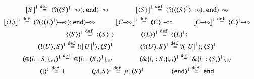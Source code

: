 \begin{figure}[t!]
\\
$
\begin{array}{c}
	\vtmap{{S}}{1} \defeq	\lhot{(\btinp{\lhot{\tmap{S}{1}}} \tinact)}
	\qquad \qquad
	\vtmap{\chtype{S}}{1} \defeq	\lhot{(\btinp{\shot{\chtype{\tmap{S}{1}}}} \tinact)}
	\\[1mm]

	\vtmap{\chtype{L}}{1} \defeq	\lhot{(\btinp{\shot{\chtype{\tmap{L}{1}}}} \tinact)}
		\qquad \quad
	\vtmap{\lhot{C}}{1} \defeq \lhot{\tmap{C}{1}}
	\qquad \quad
	\vtmap{\shot{C}}{1} \defeq \shot{\tmap{C}{1}}
	\\[1mm]

	\tmap{\chtype{S}}{1} \defeq	\chtype{\tmap{S}{1}} 
		\qquad \qquad
	\tmap{\chtype{L}}{1} \defeq	\chtype{\tmap{L}{1}}
	\\[1mm]

	\tmap{\btout{U} S}{1} \defeq \btout{{\vtmap{U}{1}}} \tmap{S}{1}
		\qquad \qquad
	\tmap{\btinp{U} S}{1} \defeq \btinp{{\vtmap{U}{1}}} \tmap{S}{1}
	\\[1mm]

	\tmap{\btsel{l_i: S_i}_{i \in I}}{1} \defeq \btsel{l_i: \tmap{S_i}{1}}_{i \in I}
		\qquad \qquad
	\tmap{\btbra{l_i: S_i}_{i \in I}}{1} \defeq \btbra{l_i: \tmap{S_i}{1}}_{i \in I}
	\\[1mm]

	\tmap{\vart{t}}{1} \defeq \vart{t} 
	\qquad \qquad
	\tmap{\trec{t}{S}}{1}  \defeq \trec{t}{\tmap{S}{1}}
		\qquad \qquad
	\tmap{\tinact}{1}  \defeq  \tinact
	\\[1mm]
\end{array}
$


\end{figure}
